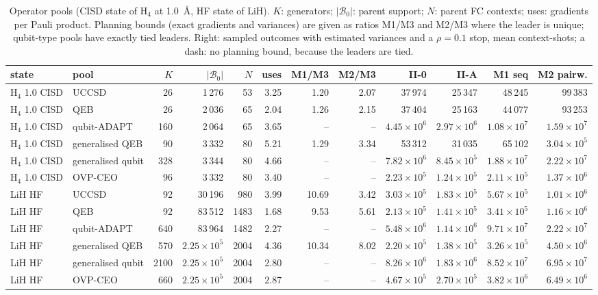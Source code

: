 \documentclass[aps,pra,reprint,superscriptaddress,nofootinbib]{revtex4-2}
\begin{document}
\begin{table}[!htb]
\centering\small
\caption{Operator pools (CISD state of H$_4$ at 1.0~\AA, HF state of LiH). $K$: generators; $\lvert\mathcal B_0\rvert$: parent support; $N$: parent FC contexts; uses: gradients per Pauli product. Planning bounds (exact gradients and variances) are given as ratios M1/M3 and M2/M3 where the leader is unique; qubit-type pools have exactly tied leaders. Right: sampled outcomes with estimated variances and a $\rho=0.1$ stop, mean context-shots; a dash: no planning bound, because the leaders are tied.}
\label{tab:q8pools}
\footnotesize\setlength{\tabcolsep}{3pt}
\begin{tabular}{llrrrrrrrrrr}
\toprule
state & pool & $K$ & $\lvert\mathcal B_0\rvert$ & $N$ & uses & M1/M3 & M2/M3 & II-0 & II-A & M1 seq & M2 pairw. \\
\midrule
H$_4$ 1.0 CISD & UCCSD & 26 & 1\,276 & 53 & 3.25 & 1.20 & 2.07 & 37\,974 & 25\,347 & 48\,245 & 99\,383 \\
H$_4$ 1.0 CISD & QEB & 26 & 2\,036 & 65 & 2.04 & 1.26 & 2.15 & 37\,404 & 25\,163 & 44\,077 & 93\,253 \\
H$_4$ 1.0 CISD & qubit-ADAPT & 160 & 2\,064 & 65 & 3.65 & -- & -- & $4.45\times10^{6}$ & $2.97\times10^{6}$ & $1.08\times10^{7}$ & $1.59\times10^{7}$ \\
H$_4$ 1.0 CISD & generalised QEB & 90 & 3\,332 & 80 & 5.21 & 1.29 & 3.34 & 53\,312 & 31\,035 & 65\,102 & $3.04\times10^{5}$ \\
H$_4$ 1.0 CISD & generalised qubit & 328 & 3\,344 & 80 & 4.66 & -- & -- & $7.82\times10^{6}$ & $8.45\times10^{5}$ & $1.88\times10^{7}$ & $2.22\times10^{7}$ \\
H$_4$ 1.0 CISD & OVP-CEO & 96 & 3\,332 & 80 & 3.40 & -- & -- & $2.23\times10^{5}$ & $1.24\times10^{5}$ & $2.11\times10^{5}$ & $1.37\times10^{6}$ \\
\midrule
LiH HF & UCCSD & 92 & 30\,196 & 980 & 3.99 & 10.69 & 3.42 & $3.03\times10^{5}$ & $1.83\times10^{5}$ & $5.67\times10^{5}$ & $1.01\times10^{6}$ \\
LiH HF & QEB & 92 & 83\,512 & 1483 & 1.68 & 9.53 & 5.61 & $2.13\times10^{5}$ & $1.41\times10^{5}$ & $3.41\times10^{5}$ & $1.16\times10^{6}$ \\
LiH HF & qubit-ADAPT & 640 & 83\,964 & 1482 & 2.27 & -- & -- & $5.48\times10^{6}$ & $1.14\times10^{6}$ & $9.71\times10^{7}$ & $2.22\times10^{7}$ \\
LiH HF & generalised QEB & 570 & $2.25\times10^{5}$ & 2004 & 4.36 & 10.34 & 8.02 & $2.20\times10^{5}$ & $1.38\times10^{5}$ & $3.26\times10^{5}$ & $4.50\times10^{6}$ \\
LiH HF & generalised qubit & 2100 & $2.25\times10^{5}$ & 2004 & 2.80 & -- & -- & $8.26\times10^{6}$ & $1.83\times10^{6}$ & $8.52\times10^{7}$ & $6.95\times10^{7}$ \\
LiH HF & OVP-CEO & 660 & $2.25\times10^{5}$ & 2004 & 2.87 & -- & -- & $4.67\times10^{5}$ & $2.70\times10^{5}$ & $3.82\times10^{6}$ & $6.49\times10^{6}$ \\
\bottomrule
\end{tabular}
\end{table}
\end{document}
